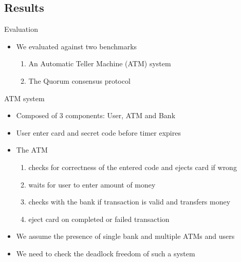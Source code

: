\subsection{Results}
\begin{frame}{Evaluation}
\begin{itemize}
 \item We evaluated \biptool{} against two benchmarks
 \begin{enumerate}
  \item An Automatic Teller Machine (ATM) system~\cite{atm}
  \item The Quorum consensus protocol~\cite{guerraoui2012speculative}
 \end{enumerate}
\end{itemize}
\end{frame}

\begin{frame}{ATM system}
\begin{itemize}
 \item Composed of 3 components: User, ATM and Bank
 \item User enter card and secret code before timer expires
 \item The ATM 
 \begin{enumerate}
  \item checks for correctness of the entered code and ejects card if wrong
  \item waits for user to enter amount of money 
  \item checks with the bank if transaction is valid and transfers money
  \item eject card on completed or failed transaction
  \end{enumerate}
 \item We assume the presence of single bank and multiple ATMs and users
 \item We need to check the deadlock freedom of such a system 	
\end{itemize}
\end{frame}

